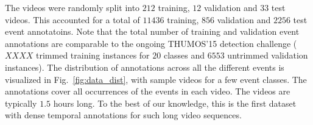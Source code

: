 The videos were randomly split into $212$ training, $12$ validation and $33$
test videos. This accounted for a total of $11436$ training, $856$ validation
and $2256$ test event annotatoins. Note that the total number of training and
validation event annotations are comparable to the ongoing THUMOS'15 detection
challenge ($XXXX$ trimmed training instances for $20$ classes and $6553$
untrimmed validation instances). The distribution of annotations across all the
different events is visualized in Fig.~\ref{fig:data_dist}, with sample videos
for a few event classes. The annotations cover all occurrences of the
events in each video. The videos are typically $1.5$ hours long.  To the best of our
knowledge, this is the first dataset with dense temporal annotations for
such long video sequences.
